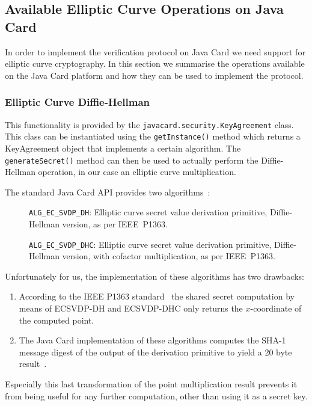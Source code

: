\subsection{Available Elliptic Curve Operations on Java Card}

In order to implement the verification protocol on Java Card we need support for
elliptic curve cryptography. In this section we summarise the operations
available on the Java Card platform and how they can be used to implement the
protocol.

\subsubsection{Elliptic Curve Diffie-Hellman}\label{sec:ecdh-api}

This functionality is provided by the \texttt{javacard.security.KeyAgreement}
class. This class can be instantiated using the \texttt{getInstance()} method
which returns a KeyAgreement object that implements a certain algorithm. The
\texttt{generateSecret()} method can then be used to actually perform the
Diffie-Hellman operation, in our case an elliptic curve multiplication.

The standard Java Card API provides two algorithms~\cite{jcapi222}:
\begin{description}
  \item[]\texttt{ALG\_EC\_SVDP\_DH}: Elliptic curve secret value derivation primitive,
    Diffie-Hellman version, as per IEEE~P1363.
  \item[]\texttt{ALG\_EC\_SVDP\_DHC}: Elliptic curve secret value derivation primitive,
    Diffie-Hellman version, with cofactor multiplication, as
    per IEEE~P1363.
\end{description}
Unfortunately for us, the implementation of these algorithms has two drawbacks:
\begin{enumerate}
  \item According to the IEEE P1363 standard~\cite{IEEE_P1363} the shared
    secret computation by means of ECSVDP-DH and ECSVDP-DHC only returns the
    $x$-coordinate of the computed point.
  \item The Java Card implementation of these algorithms computes the SHA-1
    message digest of the output of the derivation primitive to yield a 20 byte
    result~\cite{jcapi222}.
\end{enumerate}

Especially this last transformation of the point multiplication result prevents
it from being useful for any further computation, other than using it as a
secret key.

